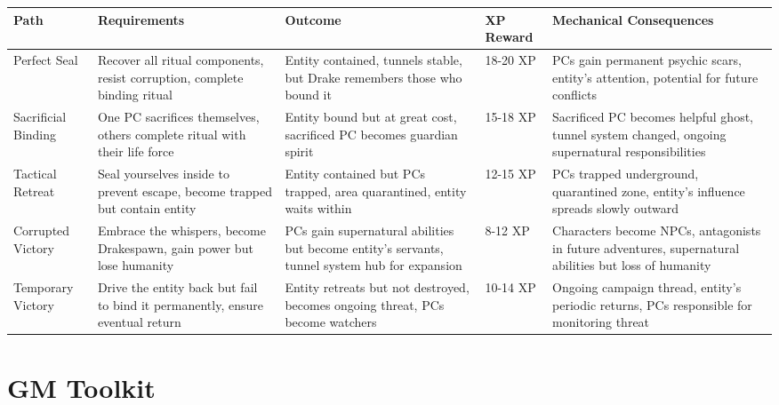 \documentclass[11pt]{article}
\begin{document}
\begin{center}
\begin{tabularx}{\textwidth}{|X|X|X|X|X|}
\hline
\textbf{Path} & \textbf{Requirements} & \textbf{Outcome} & \textbf{XP Reward} & \textbf{Mechanical Consequences} \\
\hline
Perfect Seal & Recover all ritual components, resist corruption, complete binding ritual & Entity contained, tunnels stable, but Drake remembers those who bound it & 18-20 XP & PCs gain permanent psychic scars, entity's attention, potential for future conflicts \\
\hline
Sacrificial Binding & One PC sacrifices themselves, others complete ritual with their life force & Entity bound but at great cost, sacrificed PC becomes guardian spirit & 15-18 XP & Sacrificed PC becomes helpful ghost, tunnel system changed, ongoing supernatural responsibilities \\
\hline
Tactical Retreat & Seal yourselves inside to prevent escape, become trapped but contain entity & Entity contained but PCs trapped, area quarantined, entity waits within & 12-15 XP & PCs trapped underground, quarantined zone, entity's influence spreads slowly outward \\
\hline
Corrupted Victory & Embrace the whispers, become Drakespawn, gain power but lose humanity & PCs gain supernatural abilities but become entity's servants, tunnel system hub for expansion & 8-12 XP & Characters become NPCs, antagonists in future adventures, supernatural abilities but loss of humanity \\
\hline
Temporary Victory & Drive the entity back but fail to bind it permanently, ensure eventual return & Entity retreats but not destroyed, becomes ongoing threat, PCs become watchers & 10-14 XP & Ongoing campaign thread, entity's periodic returns, PCs responsible for monitoring threat \\
\hline
\end{tabularx}
\end{center}

\section{GM Toolkit}
\end{document}
